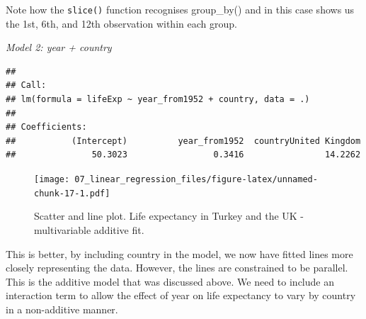 \documentclass[
  12pt,
  krantz2]{krantz}
\makeatletter
\newenvironment{Shaded}{\begin{snugshade}}{\end{snugshade}}
\newcommand{\DataTypeTok}[1]{\textcolor[rgb]{0.13,0.29,0.53}{#1}}
\newcommand{\KeywordTok}[1]{\textcolor[rgb]{0.13,0.29,0.53}{\textbf{#1}}}
\newcommand{\NormalTok}[1]{#1}
\newcommand{\OperatorTok}[1]{\textcolor[rgb]{0.81,0.36,0.00}{\textbf{#1}}}
\newcommand{\StringTok}[1]{\textcolor[rgb]{0.31,0.60,0.02}{#1}}
\newenvironment{kframe}{%
\medskip{}
\setlength{\fboxsep}{.8em}
 \def\at@end@of@kframe{}%
 \ifinner\ifhmode%
  \def\at@end@of@kframe{\end{minipage}}%
  \begin{minipage}{\columnwidth}%
 \fi\fi%
 \def\FrameCommand##1{\hskip\@totalleftmargin \hskip-\fboxsep
 \colorbox{shadecolor}{##1}\hskip-\fboxsep
     \hskip-\linewidth \hskip-\@totalleftmargin \hskip\columnwidth}%
 \MakeFramed {\advance\hsize-\width
   \@totalleftmargin\z@ \linewidth\hsize
   \@setminipage}}%
 {\par\unskip\endMakeFramed%
 \at@end@of@kframe}
\renewenvironment{Shaded}{\begin{kframe}}{\end{kframe}}
\makeatother
\begin{document}
Note how the \texttt{slice()} function recognises group\_by() and in this case shows us the 1st, 6th, and 12th observation within each group.

\emph{Model 2: year + country}

\begin{Shaded}
\end{Shaded}

\begin{verbatim}
## 
## Call:
## lm(formula = lifeExp ~ year_from1952 + country, data = .)
## 
## Coefficients:
##           (Intercept)          year_from1952  countryUnited Kingdom  
##               50.3023                 0.3416                14.2262
\end{verbatim}

\begin{Shaded}
\end{Shaded}

\begin{figure}
\centering
\texttt{[image: 07\_linear\_regression\_files/figure-latex/unnamed-chunk-17-1.pdf]}
\caption{\label{fig:unnamed-chunk-17}Scatter and line plot. Life expectancy in Turkey and the UK - multivariable additive fit.}
\end{figure}

This is better, by including country in the model, we now have fitted lines more closely representing the data.
However, the lines are constrained to be parallel.
This is the additive model that was discussed above.
We need to include an interaction term to allow the effect of year on life expectancy to vary by country in a non-additive manner.
\end{document}
